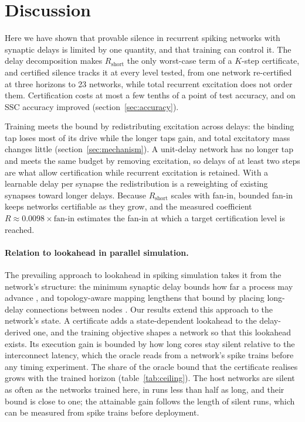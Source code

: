 \documentclass{iopjournal}
\begin{document}
\section{Discussion}

Here we have shown that provable silence in recurrent spiking networks with synaptic delays is limited by one quantity, and that training can control it. The delay decomposition makes $R_{\mathrm{short}}$ the only worst-case term of a $K$-step certificate, and certified silence tracks it at every level tested, from one network re-certified at three horizons to 23 networks, while total recurrent excitation does not order them. Certification costs at most a few tenths of a point of test accuracy, and on SSC accuracy improved (section~\ref{sec:accuracy}).

Training meets the bound by redistributing excitation across delays: the binding tap loses most of its drive while the longer taps gain, and total excitatory mass changes little (section~\ref{sec:mechanism}). A unit-delay network has no longer tap and meets the same budget by removing excitation, so delays of at least two steps are what allow certification while recurrent excitation is retained. With a learnable delay per synapse the redistribution is a reweighting of existing synapses toward longer delays. Because $R_{\mathrm{short}}$ scales with fan-in, bounded fan-in keeps networks certifiable as they grow, and the measured coefficient $R \approx 0.0098 \times \mathrm{fan\text{-}in}$ estimates the fan-in at which a target certification level is reached.
\paragraph{Relation to lookahead in parallel simulation.} The prevailing approach to lookahead in spiking simulation takes it from the network's structure: the minimum synaptic delay bounds how far a process may advance \cite{fujimoto,nest}, and topology-aware mapping lengthens that bound by placing long-delay connections between nodes \cite{lober}. Our results extend this approach to the network's state. A certificate adds a state-dependent lookahead to the delay-derived one, and the training objective shapes a network so that this lookahead exists. Its execution gain is bounded by how long cores stay silent relative to the interconnect latency, which the oracle reads from a network's spike trains before any timing experiment. The share of the oracle bound that the certificate realises grows with the trained horizon (table~\ref{tab:ceiling}). The host networks are silent as often as the networks trained here, in runs less than half as long, and their bound is close to one; the attainable gain follows the length of silent runs, which can be measured from spike trains before deployment.
\end{document}
